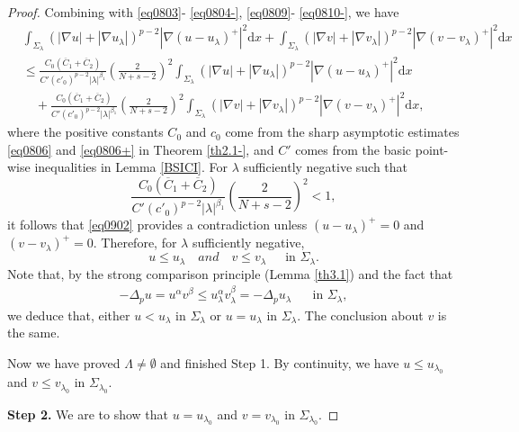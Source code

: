 \documentclass[12pt]{amsart}
\theoremstyle{definition}
\theoremstyle{remark}
\theoremstyle{conclusion}
\theoremstyle{conjecture}
\numberwithin{equation}{section}
\begin{document}
\begin{proof}
Combining with \eqref{eq0803}- \eqref{eq0804-}, \eqref{eq0809}- \eqref{eq0810-}, we have
\begin{align}\label{eq0902}
&\int_{\Sigma_\lambda}  (|\nabla u|+|\nabla u_\lambda|)^{p-2} |\nabla(u-u_\lambda)^+|^2 \mathrm{d}x + \int_{\Sigma_\lambda} (|\nabla v|+|\nabla v_\lambda|)^{p-2} |\nabla(v-v_\lambda)^+|^2 \mathrm{d}x\\
&\leq \frac{C_0(\overline{C}_1+\overline{C}_2)}{C'(c'_0)^{p-2}|\lambda|^{\beta_1}} \left( \frac{2}{N+s-2} \right)^2 \int_{\Sigma_\lambda}\left(|\nabla u| +|\nabla u_\lambda|\right)^{p-2} |\nabla(u-u_\lambda)^+|^2 \mathrm{d}x \nonumber\\
&\quad+\frac{C_0(\overline{C}_1+\overline{C}_2)}{C'(c'_0)^{p-2}|\lambda|^{\beta_1}} \left( \frac{2}{N+s-2} \right)^2  \int_{\Sigma_\lambda}  (|\nabla v|+|\nabla v_\lambda|)^{p-2} |\nabla(v-v_\lambda)^+|^2 \mathrm{d}x,  \nonumber
\end{align}
where the positive constants $C_{0}$ and $c_{0}$ come from the sharp asymptotic estimates \eqref{eq0806} and \eqref{eq0806+} in Theorem \ref{th2.1-}, and $C'$ comes from the basic point-wise inequalities in Lemma \ref{BSICI}. For $\lambda$ sufficiently negative such that
$$\frac{C_0(\overline{C}_1+\overline{C}_2)}{C'(c'_0)^{p-2}|\lambda|^{\beta_1}} \left( \frac{2}{N+s-2} \right)^2 <1, $$
it follows that \eqref{eq0902} provides a contradiction unless $(u-u_\lambda)^+ =0$ and $(v-v_\lambda)^+ =0$. Therefore, for $\lambda$ sufficiently negative,
$$ u\leq u_\lambda \quad and \quad v\leq v_\lambda  \quad\,\,\,\mbox{in}\,\,\Sigma_\lambda.$$
Note that, by the strong comparison principle (Lemma \ref{th3.1}) and the fact that
\begin{align}\label{eq0903}
-\Delta_p u =u^\alpha v^\beta \leq u^{\alpha}_{\lambda}v^{\beta}_{\lambda}= -\Delta_p u_\lambda \,\, \quad\,\,\mbox{in}\,\,\Sigma_\lambda,
\end{align}
we deduce that, either $u<u_\lambda$ in $\Sigma_\lambda$ or $u=u_\lambda$ in $\Sigma_\lambda$. The conclusion about $v$ is the same.

Now we have proved $\Lambda\neq\emptyset$ and finished Step 1. By continuity, we have $u\leq u_{\lambda_0}$ and $v\leq v_{\lambda_0}$ in $\Sigma_{\lambda_0}$.


\smallskip

{\bf Step 2.} We are to show that $u=u_{\lambda_0}$ and $v=v_{\lambda_0}$ in $\Sigma_{\lambda_0}$.


\end{proof}
\end{document}
